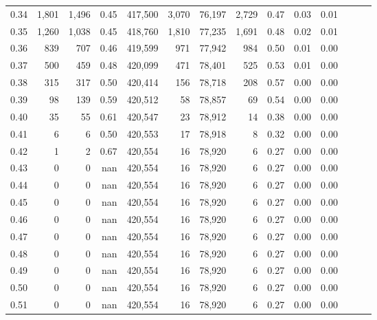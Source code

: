 \begin{tabular}{rrrrrrrrrrrrrr}
0.34 &   1,801 &  1,496 &  0.45 &  417,500 &    3,070 &  76,197 &   2,729 &  0.47 &  0.03 &      0.01 \\
0.35 &   1,260 &  1,038 &  0.45 &  418,760 &    1,810 &  77,235 &   1,691 &  0.48 &  0.02 &      0.01 \\
0.36 &     839 &    707 &  0.46 &  419,599 &      971 &  77,942 &     984 &  0.50 &  0.01 &      0.00 \\
0.37 &     500 &    459 &  0.48 &  420,099 &      471 &  78,401 &     525 &  0.53 &  0.01 &      0.00 \\
0.38 &     315 &    317 &  0.50 &  420,414 &      156 &  78,718 &     208 &  0.57 &  0.00 &      0.00 \\
0.39 &      98 &    139 &  0.59 &  420,512 &       58 &  78,857 &      69 &  0.54 &  0.00 &      0.00 \\
0.40 &      35 &     55 &  0.61 &  420,547 &       23 &  78,912 &      14 &  0.38 &  0.00 &      0.00 \\
0.41 &       6 &      6 &  0.50 &  420,553 &       17 &  78,918 &       8 &  0.32 &  0.00 &      0.00 \\
0.42 &       1 &      2 &  0.67 &  420,554 &       16 &  78,920 &       6 &  0.27 &  0.00 &      0.00 \\
0.43 &       0 &      0 &   nan &  420,554 &       16 &  78,920 &       6 &  0.27 &  0.00 &      0.00 \\
0.44 &       0 &      0 &   nan &  420,554 &       16 &  78,920 &       6 &  0.27 &  0.00 &      0.00 \\
0.45 &       0 &      0 &   nan &  420,554 &       16 &  78,920 &       6 &  0.27 &  0.00 &      0.00 \\
0.46 &       0 &      0 &   nan &  420,554 &       16 &  78,920 &       6 &  0.27 &  0.00 &      0.00 \\
0.47 &       0 &      0 &   nan &  420,554 &       16 &  78,920 &       6 &  0.27 &  0.00 &      0.00 \\
0.48 &       0 &      0 &   nan &  420,554 &       16 &  78,920 &       6 &  0.27 &  0.00 &      0.00 \\
0.49 &       0 &      0 &   nan &  420,554 &       16 &  78,920 &       6 &  0.27 &  0.00 &      0.00 \\
0.50 &       0 &      0 &   nan &  420,554 &       16 &  78,920 &       6 &  0.27 &  0.00 &      0.00 \\
0.51 &       0 &      0 &   nan &  420,554 &       16 &  78,920 &       6 &  0.27 &  0.00 &      0.00 \\

\end{tabular}
